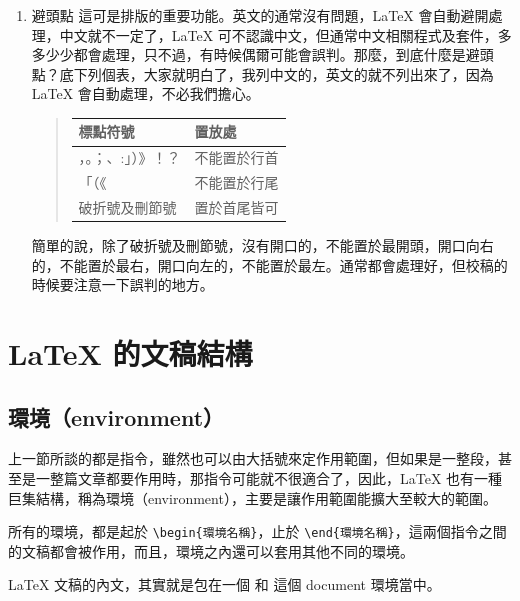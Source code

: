 \begin{enumerate}
   \item 避頭點 \newline
         這可是排版的重要功能。英文的通常沒有問題，\LaTeX{} 會自動避開處理，中文就不一定了，\LaTeX{} 可不認識中文，但通常中文相關程式及套件，多多少少都會處理，只不過，有時候偶爾可能會誤判。那麼，到底什麼是避頭點？底下列個表，大家就明白了，我列中文的，英文的就不列出來了，因為 \LaTeX{} 會自動處理，不必我們擔心。

         \begin{quote}
            \begin{tabular}{ll}
               標點符號            & 置放處       \\
               \hline
               ，。；、:」）》！？ & 不能置於行首 \\
               「（《              & 不能置於行尾 \\
               破折號及刪節號      & 置於首尾皆可 \\
            \end{tabular}
         \end{quote}

         簡單的說，除了破折號及刪節號，沒有開口的，不能置於最開頭，開口向右的，不能置於最右，開口向左的，不能置於最左。通常都會處理好，但校稿的時候要注意一下誤判的地方。

\end{enumerate}

\section{\LaTeX{} 的文稿結構}
\label{sec:struct}

\subsection{環境（environment）}

上一節所談的都是指令，雖然也可以由大括號來定作用範圍，但如果是一整段，甚至是一整篇文章都要作用時，那指令可能就不很適合了，因此，\LaTeX{} 也有一種巨集結構，稱為環境（environment），主要是讓作用範圍能擴大至較大的範圍。

所有的環境，都是起於 \verb|\begin{環境名稱}|，止於 \verb|\end{環境名稱}|，這兩個指令之間的文稿都會被作用，而且，環境之內還可以套用其他不同的環境。

\LaTeX{} 文稿的內文，其實就是包在一個 \verb|| 和 \verb|| 這個 document 環境當中。

